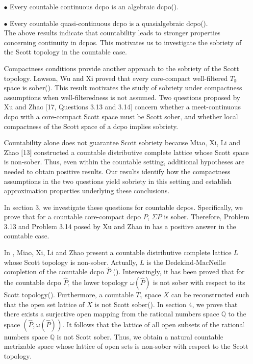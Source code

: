 \documentclass[preprint,12pt]{elsarticle}
\numberwithin{equation}{section}
\begin{document}
$\bullet$ Every countable continuous dcpo is an algebraic dcpo(\cite{U15}).

$\bullet$ Every countable quasi-continuous dcpo is a quasialgebraic dcpo(\cite{U16}).\\
The above results indicate that countability leads to stronger properties concerning continuity in dcpos. This motivates us to investigate the sobriety of the Scott topology in the countable case.

Compactness conditions provide another approach to the sobriety of the Scott topology. Lawson, Wu and Xi proved that every core-compact well-filtered $T_{0}$ space is sober(\cite{GOY03}). This result motivates the study of sobriety under compactness assumptions when well-filteredness is not assumed. Two questions proposed by Xu and Zhao [17, Questions 3.13 and 3.14] concern whether a meet-continuous dcpo with a core-compact Scott space must be Scott sober, and whether local compactness of the Scott space of a dcpo implies sobriety.

Countability alone does not guarantee Scott sobriety because Miao, Xi, Li and Zhao [13] constructed a countable distributive complete lattice whose Scott space is non-sober. Thus, even within the countable setting, additional hypotheses are needed to obtain positive results. Our results identify how the compactness assumptions in the two questions yield sobriety in this setting and establish approximation properties underlying these conclusions.

In section 3, we investigate these questions for countable dcpos. Specifically, we prove that for a countable core-compact dcpo $P$, $\Sigma P$ is sober. Therefore, Problem 3.13 and Problem 3.14 posed by Xu and Zhao in \cite{U17} has a positive answer in the countable case. 

In \cite{AB75}, Miao, Xi, Li and Zhao present a countable distributive complete lattice $L$ whose Scott topology is non-sober. Actually, $L$ is the Dedekind-MacNeille completion of the countable dcpo $\widehat{P}$ (\cite{AB75}). Interestingly, it has been proved that for the countable dcpo $\widehat{P}$, the lower topology $\omega(\widehat{P})$ is not sober with respect to its Scott topology(\cite{U18}). Furthermore, a countable $T_{1}$ space $X$ can be reconstructed such that the open set lattice of $X$ is not Scott sober(\cite{U18}). In section 4, we prove that there exists a surjective open mapping from the rational numbers space $\mathbb{Q}$ to the space $(\widehat{P},\omega(\widehat{P}))$. It follows that the lattice of all open subsets of the rational numbers space $\mathbb{Q}$ is not Scott sober. Thus, we obtain a natural countable metrizable space whose lattice of open sets is non-sober with respect to the Scott topology.
\end{document}
